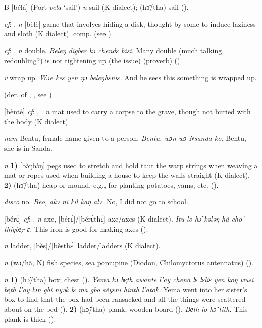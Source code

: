 \begin{letter}{B}
 [bélà] (Port \textit{vela} ‘sail') \textit{n} sail (K dialect); (hɔ̃/tha) sail (\citealt{Pichl1967}). 

 \textit{cf}: . \textit{n} [bèlè] game that involves hiding a disk, thought by some to induce laziness and sloth (K dialect). comp.  (see ) 

 \textit{cf}: . \textit{n} double. \textit{Beleŋ digber kɔ chendɛ bisi.} Many double (much talking, redoubling?) is not tightening up (the issue) (proverb) (\citealt{TISLL1979}).

 \textit{v} wrap up. \textit{Wɔe keɛ yen ŋɔ beleŋhɛniɛ.} And he sees this something is wrapped up.

 (der. of , , see ) 

 [bènté] \textit{cf}: , . \textit{n} mat used to carry a corpse to the grave, though not buried with the body (K dialect). 

 \textit{nam} Bentu, female name given to a person. \textit{Bentu, wɔn wɔ Nsanda ko.} Bentu, she is in Sanda.

 \textit{n} \textbf{1)} [bə̀ŋbə̀ŋ] pegs used to stretch and hold taut the warp strings when weaving a mat or ropes used when building a house to keep the walls straight (K dialect). \textbf{2)} (hɔ̃/tha) heap or mound, e.g., for planting potatoes, yams, etc. (\citealt{Pichl1967}).

 \textit{disco} no. \textit{Beo, akɔ ni kil kaŋ alɔ.} No, I did not go to school.

 [bérɛ́] \textit{cf}: . \textit{n} axe, [bérɛ́]/[bérɛ́thɛ́] axe/axes (K dialect). \textit{Itu lo hɔ̃ kələŋ hã cho' thigbe̹r ɛ.} This iron is good for making axes (\citealt{Pichl1967}). 

 \textit{n} ladder, [bès]/[bèsthɛ̀] ladder/ladders (K dialect).

 \textit{n} (wɔ/hã, N) fish species, sea porcupine (Diodon, Chilomyctorus antennatus) (\citealt{Pichl1967}).

 \textit{n} \textbf{1)} (hɔ̃/tha) box; chest (\citealt{Pichl1967}). \textit{Yema kɔ be̹th awante l'ay chena lɛ lɛliɛ yen koŋ wusi be̹th l'ay lɔn gbi nyək lɛ ma gbo sẽyɛni hinth l'atok.} Yema went into her sister's box to find that the box had been ransacked and all the things were scattered about on the bed (\citealt{Pichl1967}). \textbf{2)} (hɔ̃/tha) plank, wooden board (\citealt{Pichl1967}). \textit{Be̹th lo hɔ̃ tith.} This plank is thick (\citealt{Pichl1967}). 


\end{letter}
